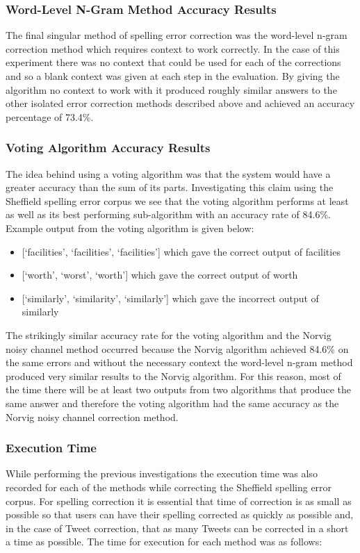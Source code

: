 \subsubsection*{Word-Level N-Gram Method Accuracy Results}
The final singular method of spelling error correction was the word-level n-gram correction method which requires context to work correctly. In the case of this experiment there was no context that could be used for each of the corrections and so a blank context was given at each step in the evaluation. By giving the algorithm no context to work with it produced roughly similar answers to the other isolated error correction methods described above and achieved an accuracy percentage of 73.4\%.

\subsubsection*{Voting Algorithm Accuracy Results}
The idea behind using a voting algorithm was that the system would have a greater accuracy than the sum of its parts. Investigating this claim using the Sheffield spelling error corpus we see that the voting algorithm performs at least as well as its best performing sub-algorithm with an accuracy rate of 84.6\%. Example output from the voting algorithm is given below:
\begin{itemize}
\item {[`facilities', `facilities', `facilities']} which gave the correct output of facilities
\item {[`worth', `worst', `worth']} which gave the correct output of worth
\item {[`similarly', `similarity', `similarly']} which gave the incorrect output of similarly
\end{itemize}
The strikingly similar accuracy rate for the voting algorithm and the Norvig noisy channel method occurred because the Norvig algorithm achieved 84.6\% on the same errors and without the necessary context the word-level n-gram method produced very similar results to the Norvig algorithm. For this reason, most of the time there will be at least two outputs from two algorithms that produce the same answer and therefore the voting algorithm had the same accuracy as the Norvig noisy channel correction method.

\subsubsection*{Execution Time}
While performing the previous investigations the execution time was also recorded for each of the methods while correcting the Sheffield spelling error corpus. For spelling correction it is essential that time of correction is as small as possible so that users can have their spelling corrected as quickly as possible and, in the case of Tweet correction, that as many Tweets can be corrected in a short a time as possible. The time for execution for each method was as follows: 


